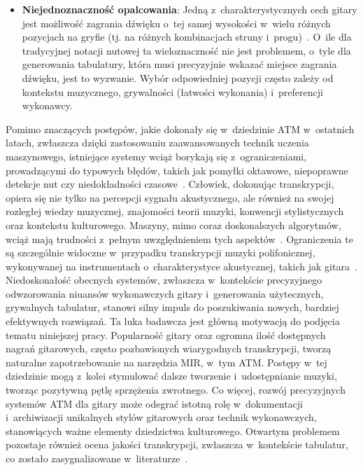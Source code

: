 \begin{itemize}
    \item \textbf{Niejednoznaczność opalcowania}: Jedną z~charakterystycznych cech gitary jest możliwość zagrania dźwięku o~tej samej wysokości w~wielu różnych pozycjach na gryfie (tj. na różnych kombinacjach struny i~progu)~\autocite{Wiggins2019TabCNN}. O~ile dla tradycyjnej notacji nutowej ta wieloznaczność nie jest problemem, o~tyle dla generowania tabulatury, która musi precyzyjnie wskazać miejsce zagrania dźwięku, jest to wyzwanie. Wybór odpowiedniej pozycji często zależy od kontekstu muzycznego, grywalności (łatwości wykonania) i~preferencji wykonawcy.
\end{itemize}

Pomimo znaczących postępów, jakie dokonały się w~dziedzinie ATM w~ostatnich latach, zwłaszcza dzięki zastosowaniu zaawansowanych technik uczenia maszynowego, istniejące systemy wciąż borykają się z~ograniczeniami, prowadzącymi do typowych błędów, takich jak pomyłki oktawowe, niepoprawne detekcje nut czy niedokładności czasowe~\autocite{Benetos2019AutomaticMusicTranscription}. Człowiek, dokonując transkrypcji, opiera się nie tylko na percepcji sygnału akustycznego, ale również na swojej rozległej wiedzy muzycznej, znajomości teorii muzyki, konwencji stylistycznych oraz kontekstu kulturowego. Maszyny, mimo coraz doskonalszych algorytmów, wciąż mają trudności z~pełnym uwzględnieniem tych aspektów~\autocite{Holzapfel2019Ethnomusicology}. Ograniczenia te są szczególnie widoczne w~przypadku transkrypcji muzyki polifonicznej, wykonywanej na instrumentach o~charakterystyce akustycznej, takich jak gitara~\autocite{BurletHindle2017IsolatedGuitarTranscription}. Niedoskonałość obecnych systemów, zwłaszcza w~kontekście precyzyjnego odwzorowania niuansów wykonawczych gitary i~generowania użytecznych, grywalnych tabulatur, stanowi silny impuls do poszukiwania nowych, bardziej efektywnych rozwiązań. Ta luka badawcza jest główną motywacją do podjęcia tematu niniejszej pracy. Popularność gitary oraz ogromna ilość dostępnych nagrań gitarowych, często pozbawionych wiarygodnych transkrypcji, tworzą naturalne zapotrzebowanie na narzędzia MIR, w~tym ATM. Postępy w~tej dziedzinie mogą z~kolei stymulować dalsze tworzenie i~udostępnianie muzyki, tworząc pozytywną pętlę sprzężenia zwrotnego. Co więcej, rozwój precyzyjnych systemów ATM dla gitary może odegrać istotną rolę w~dokumentacji i~archiwizacji unikalnych stylów gitarowych oraz technik wykonawczych, stanowiących ważne elementy dziedzictwa kulturowego. Otwartym problemem pozostaje również ocena jakości transkrypcji, zwłaszcza w~kontekście tabulatur, co zostało zasygnalizowane w~literaturze~\autocite{Zang2023SynthTab}.


